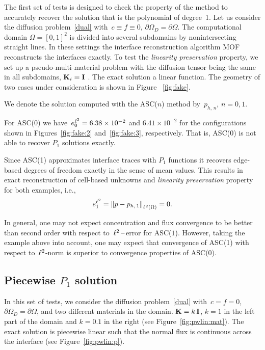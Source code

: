 The first set of tests is designed to check the property of the method to accurately recover the solution that is the polynomial of degree~1. Let us consider the diffusion problem~\eqref{dual} with~$c \equiv f \equiv 0$,
$\partial\Omega_D = \partial\Omega$. The computational domain $\Omega=[0,1]^2$
is divided into several subdomains by nonintersecting straight lines.
In these settings the interface reconstruction algorithm MOF reconstructs
the interfaces exactly. To test the {\it linearity preservation} property,
 we set up a pseudo-multi-material problem with the diffusion tensor being the
 same in all subdomains, $\boldsymbol{\mathbf{K}}_i = \boldsymbol{\mathbf{I}}$ .
 The exact solution a linear function. The geometry of two cases under consideration is shown in Figure~
\ref{fig:fake}.
	

	
	We denote
        the solution computed  with the ASC($n$) method by~$p_{h,\,n}$, $n = 0, 1$.

        For ASC(0) we have~$e^{{\ell^2}}_{0} = 6.38 \times 10^{-2}$ and $6.41 \times 10^{-2}$ for the configurations shown in Figures~\ref{fig:fake:2} and~\ref{fig:fake:3}, respectively.
        That is, ASC(0) is not able to recover $P_1$ solutions exactly.

	Since ASC(1) approximates interface traces with $P_1$ functions
        it recovers edge-based degrees of freedom exactly in the sense of mean values. This results in exact reconstruction
        of cell-based unknowns and {\it linearity preservation} property for both examples, i.e.,
	\begin{equation*}
		e^{{\ell^2}}_{1} = \left\| p - p_{h,\,1} \right\|_{{\ell^2\left({\Omega}\right)}} = 0.
	\end{equation*}
	
        In general, one may not expect concentration and flux convergence to be better than second order with respect to~${\ell^2}$\,--\,error for ASC($1$).  However, taking the example above into account, one may expect that convergence of ASC(1) with respect to~${\ell^2}$-norm is superior
        to  convergence properties of ASC(0).
	

        \subsection{Piecewise $P_1$ solution}

        In this set of tests, we consider the diffusion problem~\eqref{dual} with~$c = f = 0$, $\partial\Omega_D = \partial\Omega$,
        and two different materials in the domain.
        $\boldsymbol{\mathbf{K}} = k\,\boldsymbol{\mathbf{I}}$, $k = 1$ in the left part of the domain and $k = 0.1$ in the right (see Figure~\ref{fig:pwlin:mat}).
        The exact solution is piecewise linear such that the normal flux is continuous across the interface (see Figure~\ref{fig:pwlin:p}).
	
